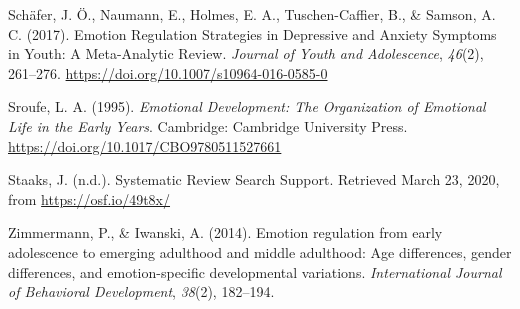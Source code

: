 \documentclass[
  english,
  man]{apa6}
\begin{document}
\leavevmode\hypertarget{ref-schaferEmotionRegulationStrategies2017}{}%
Schäfer, J. Ö., Naumann, E., Holmes, E. A., Tuschen-Caffier, B., \& Samson, A. C. (2017). Emotion Regulation Strategies in Depressive and Anxiety Symptoms in Youth: A Meta-Analytic Review. \emph{Journal of Youth and Adolescence}, \emph{46}(2), 261--276. \url{https://doi.org/10.1007/s10964-016-0585-0}

\leavevmode\hypertarget{ref-sroufeEmotionalDevelopmentOrganization1995}{}%
Sroufe, L. A. (1995). \emph{Emotional Development: The Organization of Emotional Life in the Early Years}. Cambridge: Cambridge University Press. \url{https://doi.org/10.1017/CBO9780511527661}

\leavevmode\hypertarget{ref-staaksSystematicReviewSearch}{}%
Staaks, J. (n.d.). Systematic Review Search Support. Retrieved March 23, 2020, from \url{https://osf.io/49t8x/}

\leavevmode\hypertarget{ref-zimmermannEmotionRegulationEarly2014}{}%
Zimmermann, P., \& Iwanski, A. (2014). Emotion regulation from early adolescence to emerging adulthood and middle adulthood: Age differences, gender differences, and emotion-specific developmental variations. \emph{International Journal of Behavioral Development}, \emph{38}(2), 182--194.

\endgroup
\end{document}
